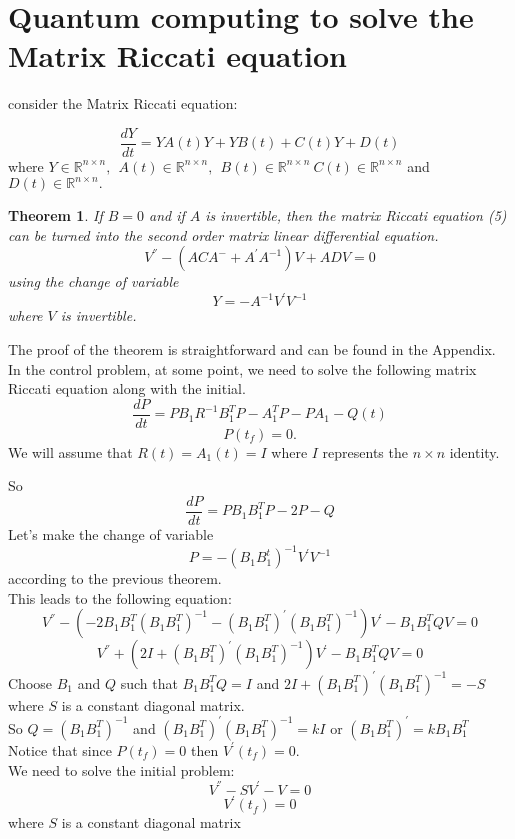 \documentclass[12pt]{article}
\newtheorem{theorem}{Theorem}
\begin{document}
\section{Quantum computing to solve the Matrix Riccati equation}


consider the Matrix Riccati equation:

\begin{equation}
\frac{dY}{dt}=YA(t)Y+ YB(t)+ C(t)Y +D(t) \end{equation} 
where $Y\in {\mathbb R}^{n\times n}, \ \  A(t) \in {\mathbb R}^{n\times n} ,\
 \ B(t)\in {\mathbb R}^{n\times n }\  C(t) \in {\mathbb R}^{n\times n}  $ and $D(t) \in{\mathbb R}^{n\times n}. $\\
\begin{theorem}
 If $B=0$ and if $A$ is invertible,  then the matrix Riccati equation (5) can be turned into the second order matrix linear differential equation. 
  \begin{equation}
      V^{''}-(ACA^{-}+A^{'}A^{-1})V+ADV=0
      \end{equation}
      using the change of variable 
      \begin{equation} Y=-A^{-1}V^{'}V^{-1}
      \end{equation}
    where $V$ is invertible.
 \end{theorem}
The proof of the theorem is straightforward and can be found in the Appendix.\\
In the control problem, at some point, we need to solve the following matrix Riccati equation along with the initial.
$$\frac{dP}{dt}=PB_1R^{-1}B_1^TP-A_1^TP-PA_1-Q(t)$$ 
$$P(t_f)=0.$$
We will assume that $R(t)=A_1(t)=I$  where $I$ represents the $n\times n$ identity.
 


So $$\frac{dP}{dt}=PB_1B_1^TP-2P-Q$$
Let's make the change of variable  $$P=-(B_1B_1^t)^{-1}V^{'}V^{-1}$$ according to the previous theorem.\\
This leads to the following equation:
$$V^{''}-(-2B_1B_1^T(B_1B_1^T)^{-1}-(B_1B_1^T)^{'}(B_1B_1^T)^{-1})V^{'}-B_1B_1^TQV=0$$
$$V^{''}+(2I+(B_1B_1^T)^{'}(B_1B_1^T)^{-1})V^{'}-B_1B_1^TQV=0$$
Choose $B_1$ and $Q$ such that $B_1B_1^TQ=I$ and $ 2I+(B_1B_1^T)^{'}(B_1B_1^T)^{-1}=-S$
where $S$ is a constant diagonal matrix. \\
So $Q=(B_1B_1^T)^{-1}$ and  $(B_1B_1^T)^{'}(B_1B_1^T)^{-1}=kI $ or $(B_1B_1^T)^{'}=kB_1B_1^T$\\
Notice that since $P(t_f)=0$ then  $V^{'}(t_f)=0$.\\	
We need to solve the initial problem:
\begin{equation}
V^{''}-SV^{'}-V=0  
\end{equation}  
$$V^{'}(t_f)=0$$ where $S$ is a  constant diagonal matrix \\
\end{document}
